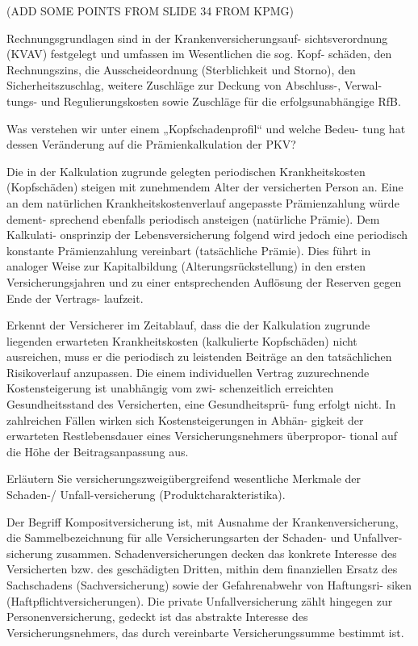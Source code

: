 (ADD SOME POINTS FROM SLIDE 34 FROM KPMG)

Rechnungsgrundlagen sind in der Krankenversicherungsauf-
sichtsverordnung (KVAV) festgelegt und umfassen im Wesentlichen die sog. Kopf-
schäden, den Rechnungszins, die Ausscheideordnung (Sterblichkeit und Storno),
den Sicherheitszuschlag, weitere Zuschläge zur Deckung von Abschluss-, Verwal-
tungs- und Regulierungskosten sowie Zuschläge für die erfolgsunabhängige RfB.


Was verstehen wir unter einem „Kopfschadenprofil“ und welche Bedeu-
tung hat dessen Veränderung auf die Prämienkalkulation der PKV?

Die in der Kalkulation zugrunde gelegten periodischen Krankheitskosten (Kopfschäden) 
steigen mit zunehmendem Alter der versicherten Person an. Eine an dem
natürlichen Krankheitskostenverlauf angepasste Prämienzahlung würde dement-
sprechend ebenfalls periodisch ansteigen (natürliche Prämie). Dem Kalkulati-
onsprinzip der Lebensversicherung folgend wird jedoch eine periodisch konstante
Prämienzahlung vereinbart (tatsächliche Prämie). Dies führt in analoger Weise
zur Kapitalbildung (Alterungsrückstellung) in den ersten Versicherungsjahren
und zu einer entsprechenden Auflösung der Reserven gegen Ende der Vertrags-
laufzeit.


Erkennt der Versicherer im Zeitablauf, dass die der Kalkulation zugrunde liegenden
erwarteten Krankheitskosten (kalkulierte Kopfschäden) nicht ausreichen,
muss er die periodisch zu leistenden Beiträge an den tatsächlichen Risikoverlauf anzupassen.
Die einem individuellen Vertrag zuzurechnende Kostensteigerung ist unabhängig vom zwi-
schenzeitlich erreichten Gesundheitsstand des Versicherten, eine Gesundheitsprü-
fung erfolgt nicht. In zahlreichen Fällen wirken sich Kostensteigerungen in Abhän-
gigkeit der erwarteten Restlebensdauer eines Versicherungsnehmers überpropor-
tional auf die Höhe der Beitragsanpassung aus.


Erläutern Sie versicherungszweigübergreifend wesentliche Merkmale
der Schaden-/ Unfall-versicherung (Produktcharakteristika).


Der Begriff Kompositversicherung ist, mit Ausnahme der Krankenversicherung,
die Sammelbezeichnung für alle Versicherungsarten der Schaden- und Unfallver-
sicherung zusammen. Schadenversicherungen decken das konkrete Interesse
des Versicherten bzw. des geschädigten Dritten, mithin dem finanziellen Ersatz
des Sachschadens (Sachversicherung) sowie der Gefahrenabwehr von Haftungsri-
siken (Haftpflichtversicherungen).
Die private Unfallversicherung zählt hingegen zur Personenversicherung, 
gedeckt ist das abstrakte Interesse des Versicherungsnehmers, 
das durch vereinbarte Versicherungssumme bestimmt ist.

